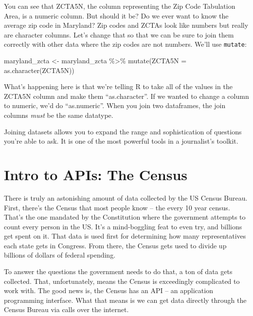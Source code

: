 \documentclass[
  letterpaper,
  DIV=11,
  numbers=noendperiod]{scrreprt}
\newenvironment{Shaded}{\begin{snugshade}}{\end{snugshade}}
\newcommand{\AttributeTok}[1]{\textcolor[rgb]{0.40,0.45,0.13}{#1}}
\newcommand{\FunctionTok}[1]{\textcolor[rgb]{0.28,0.35,0.67}{#1}}
\newcommand{\NormalTok}[1]{\textcolor[rgb]{0.00,0.23,0.31}{#1}}
\newcommand{\OtherTok}[1]{\textcolor[rgb]{0.00,0.23,0.31}{#1}}
\newcommand{\SpecialCharTok}[1]{\textcolor[rgb]{0.37,0.37,0.37}{#1}}
\begin{document}
You can see that ZCTA5N, the column representing the Zip Code Tabulation
Area, is a numeric column. But should it be? Do we ever want to know the
average zip code in Maryland? Zip codes and ZCTAs look like numbers but
really are character columns. Let's change that so that we can be sure
to join them correctly with other data where the zip codes are not
numbers. We'll use \texttt{mutate}:

\begin{Shaded}
\begin{Highlighting}[]
\NormalTok{maryland\_zcta }\OtherTok{\textless{}{-}}\NormalTok{ maryland\_zcta }\SpecialCharTok{\%\textgreater{}\%} \FunctionTok{mutate}\NormalTok{(}\AttributeTok{ZCTA5N =} \FunctionTok{as.character}\NormalTok{(ZCTA5N))}
\end{Highlighting}
\end{Shaded}

What's happening here is that we're telling R to take all of the values
in the ZCTA5N column and make them ``as.character''. If we wanted to
change a column to numeric, we'd do ``as.numeric''. When you join two
dataframes, the join columns \emph{must} be the same datatype.

Joining datasets allows you to expand the range and sophistication of
questions you're able to ask. It is one of the most powerful tools in a
journalist's toolkit.


\hypertarget{intro-to-apis-the-census}{%
\chapter{Intro to APIs: The Census}\label{intro-to-apis-the-census}}

There is truly an astonishing amount of data collected by the US Census
Bureau. First, there's the Census that most people know -- the every 10
year census. That's the one mandated by the Constitution where the
government attempts to count every person in the US. It's a
mind-boggling feat to even try, and billions get spent on it. That data
is used first for determining how many representatives each state gets
in Congress. From there, the Census gets used to divide up billions of
dollars of federal spending.

To answer the questions the government needs to do that, a ton of data
gets collected. That, unfortunately, means the Census is exceedingly
complicated to work with. The good news is, the Census has an API -- an
application programming interface. What that means is we can get data
directly through the Census Bureau via calls over the internet.
\end{document}
